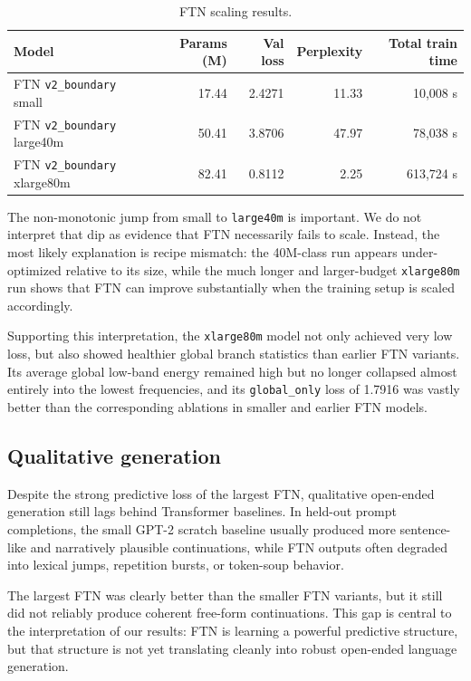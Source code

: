 \documentclass[11pt]{article}
\begin{document}
\begin{table}[ht]
    \centering
    \caption{FTN scaling results.}
    \label{tab:scaling}
    \begin{tabular}{lrrrr}
        \toprule
        Model & Params (M) & Val loss & Perplexity & Total train time \\
        \midrule
        FTN \texttt{v2\_boundary} small & 17.44 & 2.4271 & 11.33 & 10{,}008 s \\
        FTN \texttt{v2\_boundary} large40m & 50.41 & 3.8706 & 47.97 & 78{,}038 s \\
        FTN \texttt{v2\_boundary} xlarge80m & 82.41 & 0.8112 & 2.25 & 613{,}724 s \\
        \bottomrule
    \end{tabular}
\end{table}

The non-monotonic jump from small to \texttt{large40m} is important. We do not interpret that dip as evidence that FTN necessarily fails to scale. Instead, the most likely explanation is recipe mismatch: the 40M-class run appears under-optimized relative to its size, while the much longer and larger-budget \texttt{xlarge80m} run shows that FTN can improve substantially when the training setup is scaled accordingly.

Supporting this interpretation, the \texttt{xlarge80m} model not only achieved very low loss, but also showed healthier global branch statistics than earlier FTN variants. Its average global low-band energy remained high but no longer collapsed almost entirely into the lowest frequencies, and its \texttt{global\_only} loss of 1.7916 was vastly better than the corresponding ablations in smaller and earlier FTN models.

\subsection{Qualitative generation}
Despite the strong predictive loss of the largest FTN, qualitative open-ended generation still lags behind Transformer baselines. In held-out prompt completions, the small GPT-2 scratch baseline usually produced more sentence-like and narratively plausible continuations, while FTN outputs often degraded into lexical jumps, repetition bursts, or token-soup behavior.

The largest FTN was clearly better than the smaller FTN variants, but it still did not reliably produce coherent free-form continuations. This gap is central to the interpretation of our results: FTN is learning a powerful predictive structure, but that structure is not yet translating cleanly into robust open-ended language generation.
\end{document}
